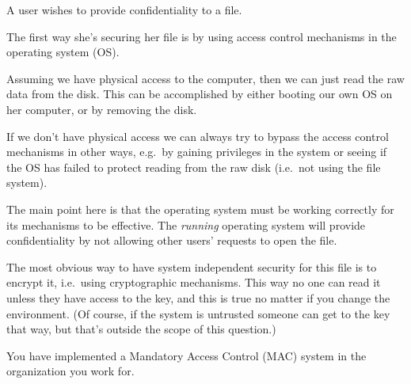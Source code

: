\documentclass[svv,addpoints]{miunexam}
\begin{document}
\begin{questions}
  
\question\label{q:trustcomp:crypto:E:C}
  A user wishes to provide confidentiality to a file.

  \begin{solution}
    The first way she's securing her file is by using access control mechanisms 
    in the operating system (OS).

    Assuming we have physical access to the computer, then we can just read the 
    raw data from the disk.
    This can be accomplished by either booting our own OS on her computer, or 
    by removing the disk.

    If we don't have physical access we can always try to bypass the access 
    control mechanisms in other ways, e.g.\ by gaining privileges in the system 
    or seeing if the OS has failed to protect reading from the raw disk (i.e.\ 
    not using the file system).

    The main point here is that the operating system must be working correctly 
    for its mechanisms to be effective.
    The \emph{running} operating system will provide confidentiality by not 
    allowing other users' requests to open the file.

    The most obvious way to have system independent security for this file is 
    to encrypt it, i.e.~using cryptographic mechanisms.
    This way no one can read it unless they have access to the key, and this is 
    true no matter if you change the environment.
    (Of course, if the system is untrusted someone can get to the key that way, 
    but that's outside the scope of this question.)
  \end{solution}


  
\question\label{q:accessctrl:trustcomp:E:C:A}
  You have implemented a Mandatory Access Control (MAC) system in the 
  organization you work for.
  \begin{parts}

\end{parts}
\end{questions}
\end{document}
